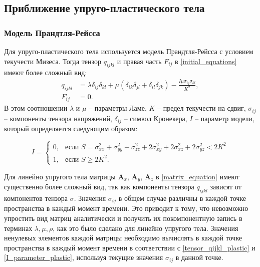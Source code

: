 
\clearpage
\newpage

\subsection{Приближение упруго-пластического тела}

\subsubsection{Модель Прандтля-Рейсса}
\label{plastic_matrixes}

Для упруго-пластического тела используется модель Прандтля-Рейсса с условием текучести Мизеса. Тогда тензор $q_{ijkl}$ и правая часть $F_{ij}$ в \ref{initial_equations} имеют более сложный вид:
\begin{align}
\label{tensor_qijkl_plastic}
q_{ijkl}&=\lambda\delta_{ij}\delta_{kl}+\mu(\delta_{ik}\delta_{jl}+\delta_{il}\delta_{jk})-\frac{I\mu\sigma_{ij}\sigma_{kl}}{K^2},
\nonumber\\
F_{ij}&=0.
\end{align}
В этом соотношении $\lambda$ и $\mu$ -- параметры Ламе, $K$ -- предел текучести на сдвиг, $\sigma_{ij}$ -- компоненты тензора напряжений, $\delta_{ij}$ -- символ Кронекера, $I$ -- параметр модели, который определяется следующим образом:

\begin{equation}
\label{I_parameter_plastic}
I=\begin{cases}
0, & \text{если $S = \sigma_{xx}^2+\sigma_{yy}^2+\sigma_{zz}^2+2\sigma_{xy}^2+2\sigma_{xz}^2+2\sigma_{yz}^2 < 2K^2$}\\
1, & \text{если $S \ge 2K^2$}.
\end{cases}
\end{equation}

Для линейно упругого тела матрицы $\mathbf{A}_x$, $\mathbf{A}_y$, $\mathbf{A}_z$ в \ref{matrix_equation} имеют существенно более сложный вид, так как компоненты тензора $q_{ijkl}$ зависят от компонентов тензора $\sigma$. Значения $\sigma_{ij}$ в общем случае различны в каждой точке пространства в каждый момент времени. Это приводит к тому, что невозможно упростить вид матриц аналитически и получить их покомпонентную запись в терминах $\lambda, \mu, \rho$, как это было сделано для линейно упругого тела. Значения ненулевых элементов каждой матрицы необходимо вычислять в каждой точке пространства в каждый момент времени в соответствии с \ref{tensor_qijkl_plastic} и \ref{I_parameter_plastic}, используя текущие значения $\sigma_{ij}$ в данной точке.

